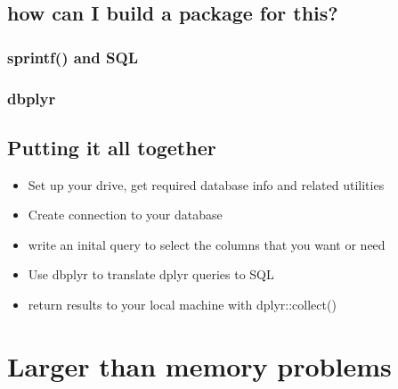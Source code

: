 \documentclass[
  letterpaper,
  DIV=11,
  numbers=noendperiod]{scrreprt}
\providecommand{\tightlist}{%
  \setlength{\itemsep}{0pt}\setlength{\parskip}{0pt}}\usepackage{longtable,booktabs,array}
\begin{document}
\section{how can I build a package for
this?}\label{how-can-i-build-a-package-for-this}

\subsection{sprintf() and SQL}\label{sprintf-and-sql}

\subsection{dbplyr}\label{dbplyr}

\section{Putting it all together}\label{putting-it-all-together}

\begin{itemize}
\tightlist
\item
  Set up your drive, get required database info and related utilities
\item
  Create connection to your database
\item
  write an inital query to select the columns that you want or need
\item
  Use dbplyr to translate dplyr queries to SQL
\item
  return results to your local machine with dplyr::collect()
\end{itemize}

\chapter{Larger than memory problems}\label{larger-than-memory-problems}
\end{document}
